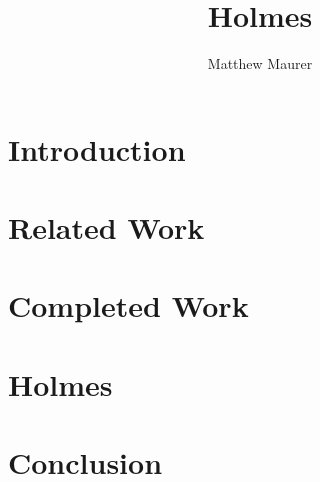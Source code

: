\documentclass{report}
\begin{document}
\newcommand{\sysname}{Holmes}
\title{\sysname}
\author{Matthew Maurer}
\maketitle
\begin{abstract}

\end{abstract}
\tableofcontents
\chapter{Introduction}

\chapter{Related Work}
\chapter{Completed Work}

\chapter{\sysname}

\chapter{Conclusion}
\end{document}
